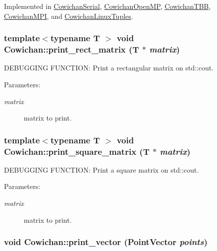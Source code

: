 Implemented in \hyperlink{class_cowichan_serial_05f6899081a457d58978e4f6bda2db6a}{CowichanSerial}, \hyperlink{class_cowichan_open_m_p_99a0570f754ac82968d73093476de533}{CowichanOpenMP}, \hyperlink{class_cowichan_t_b_b_92a763b9733cdcceda13b7b7ea0bc229}{CowichanTBB}, \hyperlink{class_cowichan_m_p_i_39fcc8a331b0e26438fbf43fa01cf7c1}{CowichanMPI}, and \hyperlink{class_cowichan_linux_tuples_b16e1c3b60f920c12460a74289558dcb}{CowichanLinuxTuples}.\hypertarget{class_cowichan_14e706ef5a5f7661a623c595d7ed76f1}{
\subsubsection[{print\_\-rect\_\-matrix}]{\setlength{\rightskip}{0pt plus 5cm}template$<$typename T $>$ void Cowichan::print\_\-rect\_\-matrix (T $\ast$ {\em matrix})}}
\label{class_cowichan_14e706ef5a5f7661a623c595d7ed76f1}


DEBUGGING FUNCTION: Print a rectangular matrix on std::cout. \begin{Desc}
\item[Parameters:]
\begin{description}
\item[{\em matrix}]matrix to print. \end{description}
\end{Desc}
\hypertarget{class_cowichan_e8fdfb7dd3e8be0a7e9dbc531b1298d2}{
\subsubsection[{print\_\-square\_\-matrix}]{\setlength{\rightskip}{0pt plus 5cm}template$<$typename T $>$ void Cowichan::print\_\-square\_\-matrix (T $\ast$ {\em matrix})}}
\label{class_cowichan_e8fdfb7dd3e8be0a7e9dbc531b1298d2}


DEBUGGING FUNCTION: Print a square matrix on std::cout. \begin{Desc}
\item[Parameters:]
\begin{description}
\item[{\em matrix}]matrix to print. \end{description}
\end{Desc}
\hypertarget{class_cowichan_3b974ae1693ac661fb079b28981ca885}{
\subsubsection[{print\_\-vector}]{\setlength{\rightskip}{0pt plus 5cm}void Cowichan::print\_\-vector ({\bf PointVector} {\em points})}}
\label{class_cowichan_3b974ae1693ac661fb079b28981ca885}



